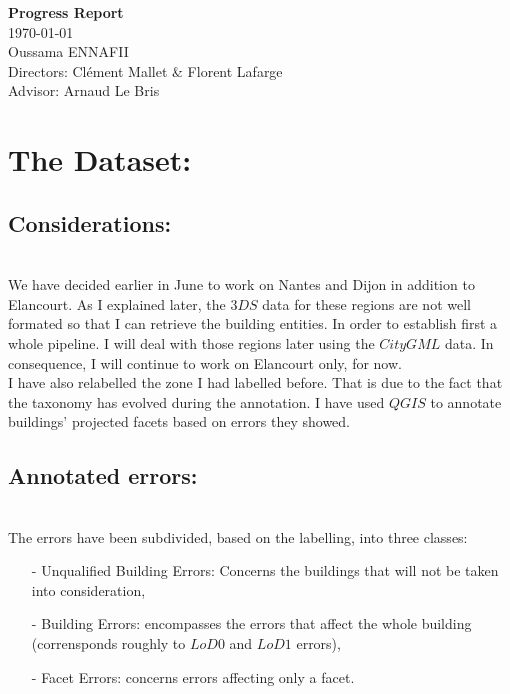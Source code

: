 \documentclass[a4paper, 11pt]{article}
\begin{document}
	\begin{centering}
		\Large{\textbf{Progress Report}}\\
		\large{\today}
~\\
		Oussama ENNAFII\\
		Directors: Cl\'ement Mallet \& Florent Lafarge \\
		Advisor: Arnaud Le Bris \\

	\end{centering}


	\section{The Dataset:}
	\subsection{Considerations:}
~\\

	We have decided earlier in June to work on Nantes and Dijon in addition to
	Elancourt. As I explained later, the $3DS$ data for these regions are not
	well formated so that I can retrieve the building entities. In order to
	establish first a whole pipeline. I will deal with those regions later using
	the $CityGML$ data. In consequence, I will continue to work on Elancourt
	only, for now.\\

	I have also relabelled the zone I had labelled before. That is due to the fact
	that the taxonomy has evolved during the annotation. I have used $QGIS$ to
	annotate buildings' projected facets based on errors they showed.\\

	\subsection{Annotated errors:}
~\\


	The errors have been subdivided, based on the labelling, into three classes:

	\begin{itemize}
		\item[-] Unqualified Building Errors: Concerns the buildings that will not
		be taken into consideration,
		\item[-] Building Errors: encompasses the errors that affect the whole
		building (corrensponds roughly to $LoD0$ and $LoD1$ errors),
		\item[-] Facet Errors: concerns errors affecting only a facet.
	\end{itemize}
\end{document}
